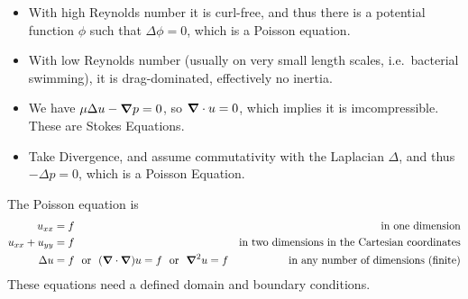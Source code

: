 \documentclass{article}
\begin{document}
\begin{itemize}
\begin{itemize}
                \item With high Reynolds number it is curl-free, and thus there is a potential function $\phi$ such that $\Delta\phi = 0$, which is a Poisson equation.
                \item With low Reynolds number (usually on very small length scales, i.e.~bacterial swimming), it is drag-dominated, effectively no inertia.
                \item We have $\mu\Delta u - \grad p = 0$, so $\grad \cdot u = 0$, which implies it is imcompressible.  These are Stokes Equations.
                \item Take Divergence, and assume commutativity with the Laplacian $\Delta$, and thus $-\Delta p = 0$, which is a Poisson Equation.
            \end{itemize}
        \end{itemize}

        The Poisson equation is
        \begin{align*}
            u_{xx} &= f & \text{in one dimension} \\
            u_{xx} + u_{yy} &= f & \text{in two dimensions in the Cartesian coordinates} \\
            \Delta u &= f\ \ \text{or}\ \ (\grad \cdot \grad) u = f\ \ \text{or}\ \ \grad^2 u = f & \text{in any number of dimensions (finite)}
        \end{align*}
        These equations need a defined domain and boundary conditions.
\end{document}
